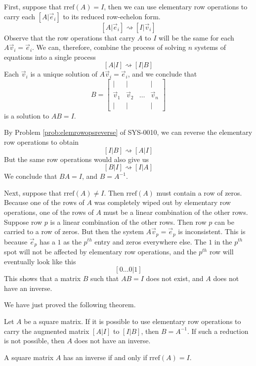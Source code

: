 \documentclass{ximera}
\begin{document}
First, suppose that $\mbox{rref}(A)=I$, then we can use elementary row operations to carry each $[A|\vec{e}_i]$ to its reduced row-echelon form.
$$[A|\vec{e}_i]\rightsquigarrow [I|\vec{v}_i]$$
Observe that the row operations that carry $A$ to $I$ will be the same for each $A\vec{v}_i=\vec{e}_i$.  We can, therefore, combine the process of solving $n$ systems of equations into a single process
$$[A|I]\rightsquigarrow [I|B]$$
Each $\vec{v}_i$ is a unique solution of $A\vec{v}_i=\vec{e}_i$, and we conclude that $$B=\begin{bmatrix}
           | & |& &|\\
		\vec{v}_1 & \vec{v}_2 &\dots &\vec{v}_n\\
		|&| & &|
         \end{bmatrix}$$ is a solution to $AB=I$.  
 
By Problem \ref{prob:elemrowopsreverse} of SYS-0010, we can reverse the elementary row operations to obtain
$$[I|B]\rightsquigarrow [A|I]$$
But the same row operations would also give us
$$[B|I]\rightsquigarrow [I|A]$$
We conclude that $BA=I$, and $B=A^{-1}$.
         
Next, suppose that $\mbox{rref}(A)\neq I$.  Then $\mbox{rref}(A)$ must contain a row of zeros.  Because one of the rows of $A$ was completely wiped out by elementary row operations, one of the rows of $A$ must be a linear combination of the other rows.  Suppose row $p$ is a linear combination of the other rows.  Then row $p$ can be carried to a row of zeros. But then the system $A\vec{v}_p=\vec{e}_p$ is inconsistent.  This is because $\vec{e}_p$ has a $1$ as the $p^{th}$ entry and zeros everywhere else.  The $1$ in the $p^{th}$ spot will not be affected by elementary row operations, and the $p^{th}$ row will eventually look like this
$$[0\ldots 0|1]$$
This shows that a matrix $B$ such that $AB=I$ does not exist, and $A$ does not have an inverse.

We have just proved the following theorem.

\begin{theorem}\label{th:matrixinverse}
Let $A$ be a square matrix.  If it is possible to use elementary row operations to carry the augmented matrix $[A|I]$ to $[I|B]$, then $B=A^{-1}$.  If such a reduction is not possible, then $A$ does not have an inverse.
\end{theorem}

\begin{corollary}\label{cor:rrefI}
A square matrix $A$ has an inverse if and only if $\mbox{rref}(A)=I$.
\end{corollary}
\end{document}

